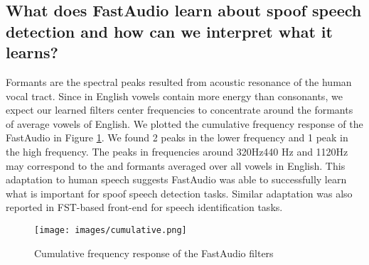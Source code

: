 \documentclass[conference]{IEEEtran}
\begin{document}
\subsection{\textbf{What does FastAudio learn about spoof speech detection and how can we interpret what it learns?}}

Formants are the spectral peaks resulted from acoustic resonance of the human vocal tract. Since in English vowels contain more energy than consonants, we expect our learned filters center frequencies to concentrate around the formants of average vowels of English\cite{Lindblom1990ExplainingPV}. We plotted the cumulative frequency response of the FastAudio in Figure \ref{fig:cumulative}. We found 2 peaks in the lower frequency and 1 peak in the high frequency. The peaks in frequencies around 320Hz440 Hz and 1120Hz may correspond to the  and  formants averaged over all vowels in English\cite{Ravanelli2018SpeakerRF}. This adaptation to human speech suggests FastAudio was able to successfully learn what is important for spoof speech detection tasks. Similar adaptation was also reported in FST-based front-end for speech identification tasks\cite{Ravanelli2018SpeakerRF}.

\begin{figure}[hpbt]
\centering
\texttt{[image: images/cumulative.png]}
\caption{Cumulative frequency response of the FastAudio filters}
\label{fig:cumulative}
\end{figure}
\end{document}
